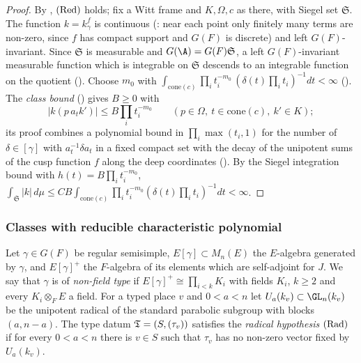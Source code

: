 \begin{proof}
By , $\textup{(Red)}$ holds; fix a Witt frame and $K,\Omega,c$ as there,
with Siegel set $\mathfrak S$. The function $k=k^f_\gamma$ is continuous
(: near each point only finitely many terms are
non-zero, since $f$ has compact support and $G(F)$ is discrete) and left $G(F)$-invariant. Since $\mathfrak S$ is
measurable and $G(\A)=G(F)\mathfrak S$, a left $G(F)$-invariant measurable function which is integrable on $\mathfrak S$
descends to an integrable function on the quotient
(). Choose $m_0$ with
$\int_{\mathrm{cone}(c)}\prod_it_i^{-m_0}\,(\delta(t)\prod_it_i)^{-1}dt<\infty$
(). The \emph{class bound}
() gives $B\ge0$ with
\[
|k(p\,a_tk')|\le B\prod_it_i^{-m_0}\qquad(p\in\Omega,\ t\in\mathrm{cone}(c),\ k'\in K);
\]
its proof combines a polynomial bound in $\prod_i\max(t_i,1)$ for the number of $\delta\in[\gamma]$ with
$a_t^{-1}\delta a_t$ in a fixed compact set with the decay of the unipotent sums of the cusp function $f$ along the deep
coordinates (). By the Siegel integration bound with
$h(t)=B\prod_it_i^{-m_0}$, $\int_{\mathfrak S}|k|\,d\mu\le CB\int_{\mathrm{cone}(c)}\prod_it_i^{-m_0}(\delta(t)\prod_i
t_i)^{-1}dt<\infty$.
\end{proof}

\subsubsection*{Classes with reducible characteristic polynomial}

Let $\gamma\in G(F)$ be regular semisimple, $E[\gamma]\subset M_n(E)$ the $E$-algebra generated by $\gamma$, and
$E[\gamma]^+$ the $F$-algebra of its elements which are self-adjoint for $J$. We say that $\gamma$ is of \emph{non-field
type} if $E[\gamma]^+\cong\prod_{i<k}K_i$ with fields $K_i$, $k\ge2$ and every $K_i\otimes_FE$ a field. For a typed place $v$
and $0<a<n$ let $U_a(k_v)\subset\GL_n(k_v)$ be the unipotent radical of the standard parabolic subgroup with blocks
$(a,n-a)$. The type datum $\mathfrak{T}=(S,(\tau_v))$ satisfies the \emph{radical hypothesis} $\textup{(Rad)}$ if for every
$0<a<n$ there is $v\in S$ such that $\tau_v$ has no non-zero vector fixed by $U_a(k_v)$.

